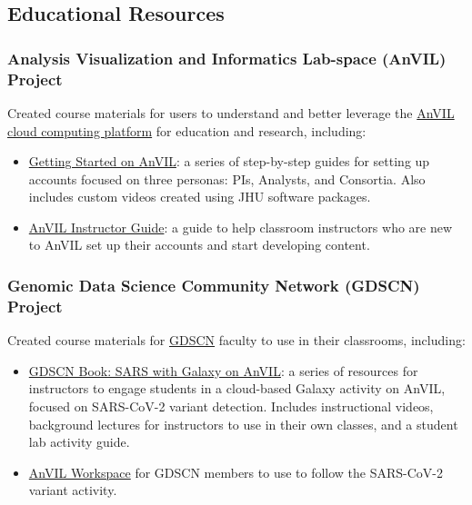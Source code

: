 \documentclass{cv}
\begin{document}
\subsection*{Educational Resources}

\subsubsection*{Analysis Visualization and Informatics Lab-space (AnVIL) Project}

Created course materials for users to understand and better leverage the \href{https://anvilproject.org/}{AnVIL cloud computing platform} for education and research, including: 

\begin{itemize}

\item \href{https://jhudatascience.org/AnVIL_Book_Getting_Started/}{Getting Started on AnVIL}: a series of step-by-step guides for setting up accounts focused on three personas: PIs, Analysts, and Consortia. Also includes custom videos created using JHU software packages.

\item \href{https://jhudatascience.org/AnVIL_Book_Instructor_Guide/}{AnVIL Instructor Guide}: a guide to help classroom instructors who are new to AnVIL set up their accounts and start developing content.

\end{itemize}

\subsubsection*{Genomic Data Science Community Network (GDSCN) Project}

Created course materials for \href{https://www.gdscn.org/}{GDSCN} faculty to use in their classrooms, including: 

\begin{itemize}

\item \href{https://jhudatascience.org/GDSCN_Book_SARS_Galaxy_on_AnVIL/}{GDSCN Book: SARS with Galaxy on AnVIL}: a series of resources for instructors to engage students in a cloud-based Galaxy activity on AnVIL, focused on SARS-CoV-2 variant detection. Includes instructional videos, background lectures for instructors to use in their own classes, and a student lab activity guide.

\item \href{https://anvil.terra.bio/#workspaces/gdscn-exercises/SARS-CoV-2-Genome}{AnVIL Workspace} for GDSCN members to use to follow the SARS-CoV-2 variant activity.

\end{itemize}
\end{document}
